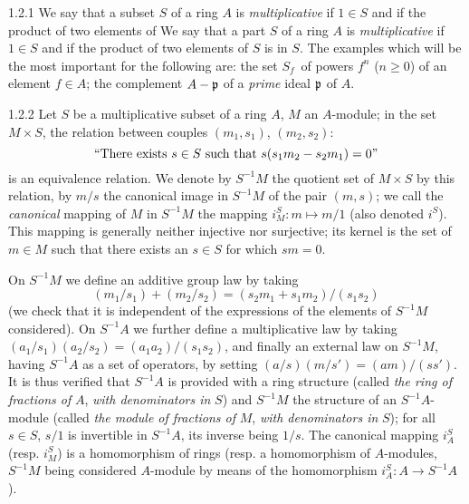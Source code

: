 \documentclass[../main.tex]{subfiles}
\begin{document}
\begin{cx}{1.2.1}
We say that a subset $S$ of a ring $A$ is \emph{multiplicative} if $1\in S$ and if the product of two elements of
We say that a part $S$ of a ring $A$ is \emph{multiplicative} if $1\in S$ and if the product of two elements of
$S$ is in $S$. The examples which will be the most important for the following are:
 the set $S_f$ of powers $f^n$ ($n\geq 0$) of an element $f\in A$;
 the complement $A-\mathfrak{p}$ of a \emph{prime} ideal $\mathfrak{p}$ of $A$.
\end{cx}

\begin{cx}{1.2.2}
Let $S$ be a multiplicative subset of a ring $A$, $M$ an $A$-module; in the set $M\times S$, the relation between
couples $(m_1,s_1)$, $(m_2,s_2)$:
\[
   ``\text{There exists } s\in S\text{ such that } s(s_1 m_2-s_2 m_1)=0"
\]
is an equivalence relation. We denote by $S^{-1}M$ the quotient set of $M\times S$ by this relation, by $m/s$ the canonical
image in $S^{-1}M$ of the pair $(m,s)$; we call the \emph{canonical} mapping of $M$ in $S^{-1}M$ the mapping $i_M^S:m\mapsto m/1$
(also denoted $i^S$). This mapping is generally neither injective nor surjective; its kernel is the set of $m\in M$ such that there
exists an $s\in S$ for which $sm=0$.

On $S^{-1}M$ we define an additive group law by taking
\[
  (m_1/s_1)+(m_2/s_2)=(s_2 m_1+s_1 m_2)/(s_1 s_2)
\]
(we check that it is independent of the expressions of the elements of $S^{-1}M$ considered). On $S^{-1}A$ we further define
a multiplicative law by taking $(a_1/s_1)(a_2/s_2)=(a_1 a_2)/(s_1 s_2)$, and finally an external law on $S^{-1}M$, having
$S^{-1}A$ as a set of operators, by setting $(a/s)(m/s')=(am)/(ss')$. It is thus verified that $S^{-1}A$ is provided with a
ring structure (called \emph{the ring of fractions of} $A$, \emph{with denominators in} $S$) and $S^{-1}M$ the structure of
an $S^{-1}A$-module (called \emph{the  module of fractions of} $M$, \emph{with denominators in} $S$); for all $s\in S$,
$s/1$ is invertible in $S^{-1}A$, its inverse being $1/s$. The canonical mapping $i_A^S$ (resp. $i_M^S$) is a homomorphism
of rings (resp. a homomorphism of $A$-modules, $S^{-1}M$ being considered $A$-module by means of the homomorphism
$i_A^S:A\to S^{-1}A$).
\end{cx}
\end{document}
